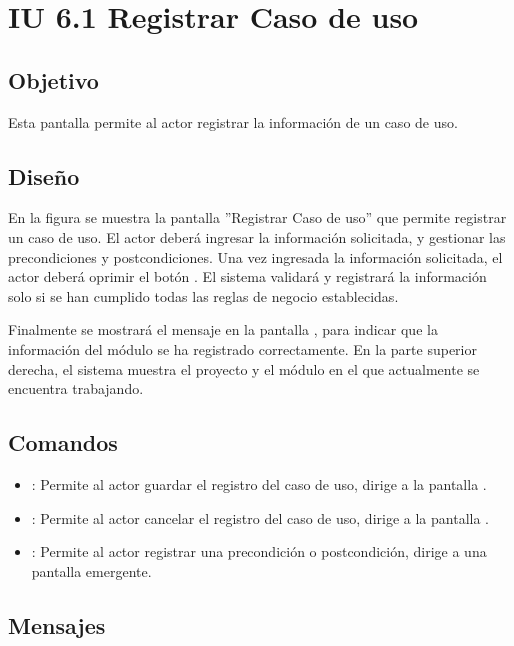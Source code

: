 \section{IU 6.1 Registrar Caso de uso}

\subsection{Objetivo}
	Esta pantalla permite al actor registrar la información de un caso de uso.
\subsection{Diseño}
	En la figura  se muestra la pantalla ''Registrar Caso de uso'' que permite registrar un caso de
	uso. El actor deberá ingresar la información solicitada, y gestionar las precondiciones y postcondiciones.
	Una vez ingresada la información solicitada, el actor deberá oprimir el botón  . El sistema validará y registrará la información solo si se han cumplido todas las reglas de negocio establecidas.
	
	Finalmente se mostrará el mensaje  en la pantalla , para indicar que la información del módulo se ha registrado correctamente.
	En la parte superior derecha, el sistema muestra el proyecto y el módulo en el que actualmente se encuentra trabajando.

\subsection{Comandos}
\begin{itemize}
	\item {}: Permite al actor guardar el registro del caso de uso, dirige a la pantalla .
	\item {}: Permite al actor cancelar el registro del caso de uso, dirige a la pantalla .
	\item {}: Permite al actor registrar una precondición o postcondición, dirige a una pantalla emergente.
\end{itemize}

\subsection{Mensajes}

